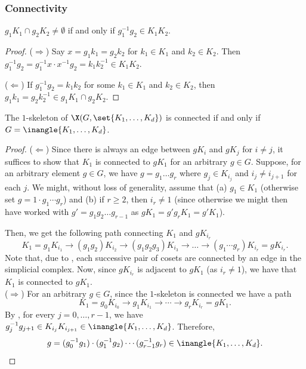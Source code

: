 \documentclass{toc}
\begin{document}
\subsubsection*{Connectivity}  %

\begin{observation}\label{obs:nonempty-coset-intersection}
$g_1 K_1 \cap g_2 K_2 \neq \emptyset$ if and only if $g_1^{-1} g_2 \in K_1 K_2$. 
\end{observation}
\begin{proof}
  ($\Rightarrow$) Say $x = g_1 k_1 = g_2 k_2$ for $k_1 \in K_1$ and $k_2 \in K_2$. Then $g_1^{-1} g_2 = g_1^{-1} x \cdot x^{-1} g_2 = k_1 k_2^{-1} \in K_1 K_2$.

  ($\Leftarrow$) If $g_1^{-1} g_2 = k_1 k_2$ for
some  %
$k_1 \in K_1$ and $k_2 \in K_2$, then $g_1 k_1 = g_2 k_2^{-1} \in g_1 K_1 \cap g_2 K_2$. 
\end{proof}

\begin{lemma}\label{lem:conn-criterion}
The $1$-skeleton %
%
%
%
%
of $\X(G,\set{K_1,\ldots, K_d})$ is connected if and only if 
$G = \inangle{K_1,\ldots, K_d}$. 
\end{lemma}
\begin{proof}
  ($\Leftarrow$) Since there is always an edge between $gK_i$ and $gK_j$ for $i\neq j$, it suffices to show that $K_1$ is connected to $gK_1$ for an arbitrary $g \in G$.
Suppose, for an arbitrary element $g \in G$, we have $g = g_1 \ldots
g_r$ where $g_j \in K_{i_j}$ and $i_j \neq i_{j+1}$ for each $j$. We might, without loss of generality, assume that
(a) $g_1 \in K_1$ (otherwise set $g = 1\cdot g_1 \cdots g_r$)  and (b) if $r \geq 2$,
then $i_r \neq 1$ (since otherwise we might then have worked with $g' =
g_1g_2 \ldots g_{r-1}$ as $gK_1= g'g_r K_1 = g'K_1$).

Then, we get the following path connecting $K_1 $ and $g K_{i_r}$
  \[
    K_1 =  g_1 K_{i_1} \rightarrow (g_1 g_2) K_{i_2} \rightarrow (g_1 g_2 g_3) K_{i_3} \rightarrow \ldots \rightarrow (g_1\cdots g_r) K_{i_r} = g K_{i_r}.
  \]
  Note that, due to , each
  successive pair of cosets are connected by an edge in the simplicial
  complex. Now, since $gK_{i_r}$ is adjacent to $gK_1$ (as $i_r \neq
  1$), we have that $K_1$ is connected to $gK_1$. \\

  \noindent
  ($\Rightarrow$) For an arbitrary $g \in G$, since the $1$-skeleton is connected we have a path
  \[
    K_1 = g_0 K_{i_0} \rightarrow  g_1 K_{i_1} \rightarrow \cdots \rightarrow g_r K_{i_r} = g K_1.
  \]
  By , for every $j = 0,\ldots, r-1$, we have $g_j^{-1} g_{j+1} \in K_{i_j} K_{i_{j+1}} \in \inangle{K_1,\ldots, K_d}$.
  Therefore,
  \[
    g = (g_0^{-1} g_1) \cdot (g_1^{-1} g_2) \cdots (g_{r-1}^{-1} g_r) \in \inangle{K_1,\ldots, K_d}. \qedhere
  \]  
\end{proof}
\end{document}
